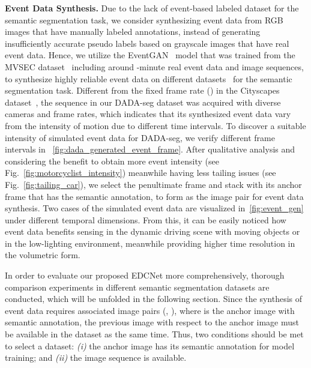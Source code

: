 \documentclass[journal]{IEEEtran}
\begin{document}
\textbf{Event Data Synthesis.} Due to the lack of event-based labeled dataset for the semantic segmentation task, we consider synthesizing event data from RGB images that have manually labeled annotations, instead of generating insufficiently accurate pseudo labels based on grayscale images that have real event data. Hence, we utilize the EventGAN~\cite{zhu2019eventgan} model that was trained from the MVSEC dataset~\cite{zhu2018MVSEC} including around -minute real event data and image sequences, to synthesize highly reliable event data on different datasets~\cite{cordts2016cityscapes}\cite{xie2016semantic}\cite{yu2020bdd100k}\cite{wang2019apolloscape} for the semantic segmentation task. Different from the fixed frame rate () in the Cityscapes dataset~\cite{cordts2016cityscapes}, the sequence in our DADA-seg dataset was acquired with diverse cameras and frame rates, which indicates that its synthesized event data vary from the intensity of motion due to different time intervals. {To discover a suitable intensity of simulated event data for DADA-seg, we verify different frame intervals in ~\cref{fig:dada_generated_event_frame}. After qualitative analysis and considering the benefit to obtain more event intensity (see Fig.~\ref{fig:motorcyclist_intensity}) meanwhile having less tailing issues (see Fig.~\ref{fig:tailing_car}), we select the penultimate frame and stack with its anchor frame that has the semantic annotation, to form as the image pair for event data synthesis.} Two cases of the simulated event data are visualized in~\cref{fig:event_gen} under different temporal dimensions. From this, it can be easily noticed how event data benefits sensing in the dynamic driving scene with moving objects or in the low-lighting environment, meanwhile providing higher time resolution in the volumetric form.

In order to evaluate our proposed EDCNet more comprehensively, thorough comparison experiments in different semantic segmentation datasets are conducted, which will be unfolded in the following section. Since the synthesis of event data requires associated image pairs (, ), where  is the anchor image with semantic annotation, the previous image with respect to the anchor image must be available in the dataset as the same time. Thus, two conditions should be met to select a dataset: \textit{(i)} the anchor image has its semantic annotation for model training; and \textit{(ii)} the image sequence is available.

\end{document}
